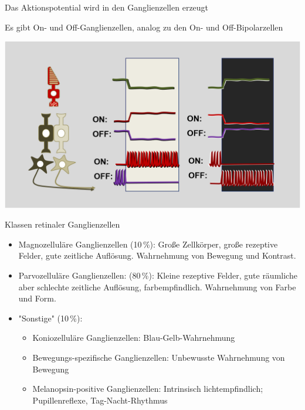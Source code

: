 \documentclass{beamer}
\begin{document}
\begin{frame}{Das Aktionspotential wird in den Ganglienzellen erzeugt}

Es gibt On- und Off-Ganglienzellen, analog zu den On- und Off-Bipolarzellen

\begin{center}
    \includegraphics[width=\textwidth]{on_off_bipolarzellen.png}
\end{center}


\end{frame}


\begin{frame}{Klassen retinaler Ganglienzellen}

\begin{itemize}
    \item 
    Magnozelluläre Ganglienzellen (10\,\%): Große Zellkörper, große rezeptive Felder, gute zeitliche Auflösung. Wahrnehmung von Bewegung und Kontrast.
    \pause
    \item
    Parvozelluläre Ganglienzellen: (80\,\%): Kleine rezeptive Felder, gute räumliche aber schlechte zeitliche Auflösung, farbempfindlich. Wahrnehmung von Farbe und Form.
    \pause
    \item
    "Sonstige" (10\,\%):
    \begin{itemize}
        \item Koniozelluläre Ganglienzellen: Blau-Gelb-Wahrnehmung
        \item Bewegungs-spezifische Ganglienzellen: Unbewusste Wahrnehmung von Bewegung
    \item Melanopsin-positive Ganglienzellen: Intrinsisch lichtempfindlich; Pupillenreflexe, Tag-Nacht-Rhythmus
    \end{itemize}
\end{itemize}


\end{frame}
\end{document}
